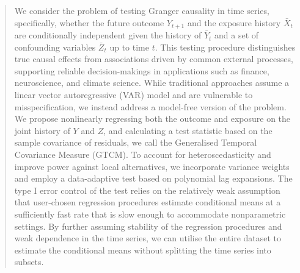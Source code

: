 \documentclass[12pt]{article}
\numberwithin{equation}{section}
\begin{document}
\bigskip
\begin{abstract}
We consider the problem of testing Granger causality in time series, specifically, whether the future outcome $Y_{t+1}$ and the exposure history $\bar X_t$ are conditionally independent given the history of $\bar Y_t$ and a set of confounding variables $\bar Z_t$ up to time $t$. 
This testing procedure distinguishes true causal effects from associations driven by common external processes, supporting reliable decision-makings in applications such as finance, neuroscience, and climate science.
While traditional approaches assume a linear vector autoregressive (VAR) model and are vulnerable to misspecification, we instead address a model-free version of the problem.
We propose nonlinearly regressing both the outcome and exposure on the joint history of $Y$ and $Z$, and calculating a test statistic based on the sample covariance of residuals, we call the Generalised Temporal Covariance Measure (GTCM). To account for heteroscedasticity and improve power against local alternatives, we incorporate variance weights and employ a data-adaptive test based on polynomial lag expansions. 
The type I error control of the test relies on the relatively weak assumption that user-chosen regression procedures estimate conditional means at a sufficiently fast rate that is slow enough to accommodate nonparametric settings. By further assuming stability of the regression procedures and weak dependence in the time series, we can utilise the entire dataset to estimate the conditional means without splitting the time series into subsets.
\end{abstract}




\end{document}
